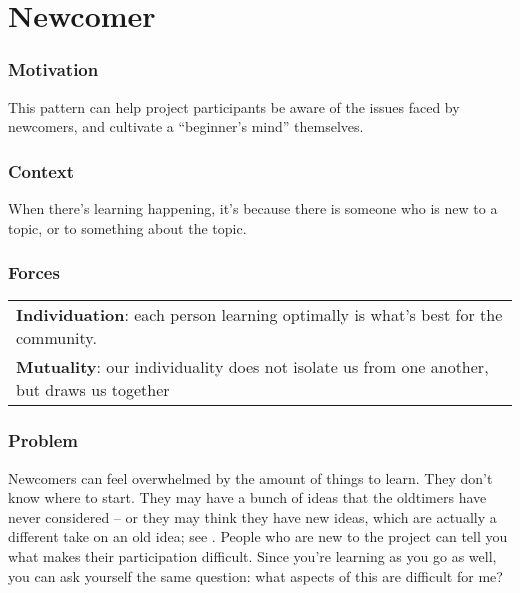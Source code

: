 

\section{Newcomer}\label{sec:Newcomer}

\subsubsection*{Motivation} This pattern can help project participants be aware of the issues faced by newcomers, and cultivate a ``beginner's mind'' themselves.

\subsubsection*{Context}
When there's learning happening, it's because there is someone who is new to a topic, or to something about the topic.

\subsubsection*{Forces}
\raisebox{-1.5\baselineskip}
{{\centering
\begin{tabular}{p{}}
\textbf{Individuation}: each person learning optimally is what's best for the community.\\
\textbf{Mutuality}: our individuality does not isolate us from one another, but draws us together
\end{tabular}
}}

\subsubsection*{Problem} Newcomers can feel overwhelmed by the amount of things to learn.  They
don't know where to start.  They may have a bunch of ideas that the
oldtimers have never considered -- or they may think they have new
ideas, which are actually a different take on an old idea; see
. People who are new to the project can tell you what makes their participation difficult.  Since you're learning as you go as well, you can ask yourself the same question: what aspects of this are difficult for me?  


